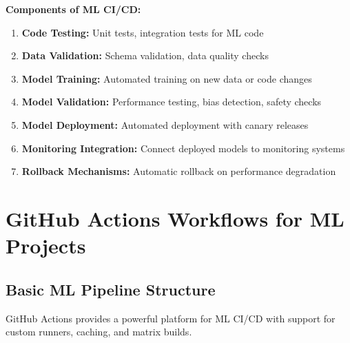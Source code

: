 \textbf{Components of ML CI/CD:}

\begin{enumerate}
    \item \textbf{Code Testing:} Unit tests, integration tests for ML code
    \item \textbf{Data Validation:} Schema validation, data quality checks
    \item \textbf{Model Training:} Automated training on new data or code changes
    \item \textbf{Model Validation:} Performance testing, bias detection, safety checks
    \item \textbf{Model Deployment:} Automated deployment with canary releases
    \item \textbf{Monitoring Integration:} Connect deployed models to monitoring systems
    \item \textbf{Rollback Mechanisms:} Automatic rollback on performance degradation
\end{enumerate}

\section{GitHub Actions Workflows for ML Projects}

\subsection{Basic ML Pipeline Structure}

GitHub Actions provides a powerful platform for ML CI/CD with support for custom runners, caching, and matrix builds.

